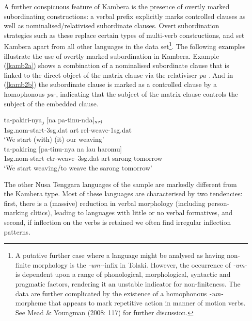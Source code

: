 A further conspicuous feature of Kambera is the presence of overtly marked subordinating constructions: a verbal prefix explicitly marks controlled clauses as well as nominalised/relativised subordinate clauses. Overt subordination strategies such as these replace certain types of multi-verb constructions, and set Kambera apart from all other languages in the data set\footnote{A putative further case where a language might be analysed as having non-finite morphology is the \textit{-um-}-infix in Tolaki. However, the occurrence of \textit{-um-} is dependent upon a range of phonological, morphological, syntactic and pragmatic factors, rendering it an unstable indicator for non-finiteness. The data are further complicated by the existence of a homophonous \textit{-um-} morpheme that appears to mark repetitive action in manner of motion verbs. See Mead \& Youngman (2008: 117) for further discussion.}. The following examples illustrate the use of overtly marked subordination in Kambera. Example (\ref{kamb2a}) shows a combination of a nominalised subordinate clause that is linked to the direct object of the matrix clause via the relativiser \textit{pa-}. And in (\ref{kamb2b}) the subordinate clause is marked as a controlled clause by a homophonous \textit{pa-}, indicating that the subject of the matrix clause controls the subject of the embedded clause.

\pex 
\a \label{kamb2a}
\gll ta-pakiri-nya$_j$ $[$na pa-tinu-nda$]_{\textsc{np} \textit{j}}$ \\
\acs{1}\acs{sg}.\acs{nom}-start-\acs{3}\acs{sg}.\acs{dat} \acs{art} \acs{rel}-weave-\acs{1}\acs{sg}.\acs{dat} \\
\glft `We start (with) (it) our weaving' \\ 
\z
\a \label{kamb2b}
\gla ta-pakiring $[$pa-tinu-nya na lau haromu$]$ \\ 
\acs{1}\acs{sg}.\acs{nom}-start \acs{ctr}-weave--\acs{3}\acs{sg}.\acs{dat} \acs{art} sarong tomorrow \\
\glft `We start weaving/to weave the sarong tomorrow' \\ 
\z
\xe

The other Nusa Tenggara languages of the sample are markedly different from the Kambera type. Most of these languages are characterised by two tendencies: first, there is a (massive) reduction in verbal morphology (including person-marking clitics), leading to languages with little or no verbal formatives, and second, if inflection on the verbs is retained we often find irregular inflection patterns. 

